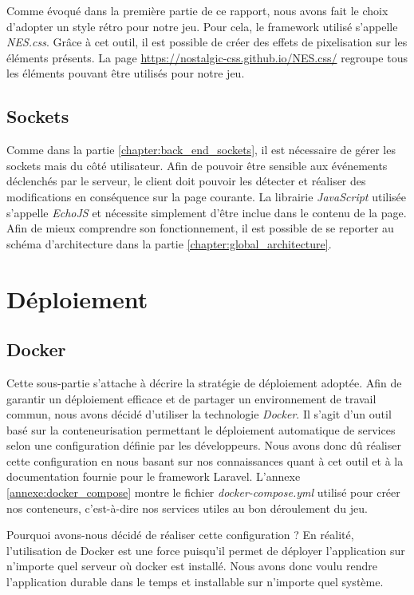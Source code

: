 \documentclass{tnreport}
\begin{document}

Comme évoqué dans la première partie de ce rapport, nous avons fait le choix d'adopter un style rétro pour notre jeu. Pour cela, le framework utilisé s'appelle \textit{NES.css}. Grâce à cet outil, il est possible de créer des effets de pixelisation sur les éléments présents. La page \url{https://nostalgic-css.github.io/NES.css/} regroupe tous les éléments pouvant être utilisés pour notre jeu. 

\subsection{Sockets}

Comme dans la partie \ref{chapter:back_end_sockets}, il est nécessaire de gérer les sockets mais du côté utilisateur. Afin de pouvoir être sensible aux événements déclenchés par le serveur, le client doit pouvoir les détecter et réaliser des modifications en conséquence sur la page courante. La librairie \textit{JavaScript} utilisée s'appelle \textit{EchoJS} et nécessite simplement d'être inclue dans le contenu de la page. Afin de mieux comprendre son fonctionnement, il est possible de se reporter au schéma d'architecture dans la partie \ref{chapter:global_architecture}.

\section{Déploiement}

\subsection{Docker}

Cette sous-partie s'attache à décrire la stratégie de déploiement adoptée. Afin de garantir un déploiement efficace et de partager un environnement de travail commun, nous avons décidé d'utiliser la technologie \textit{Docker}. Il s'agit d'un outil basé sur la conteneurisation permettant le déploiement automatique de services selon une configuration définie par les développeurs. Nous avons donc dû réaliser cette configuration en nous basant sur nos connaissances quant à cet outil et à la documentation fournie pour le framework Laravel. L'annexe \ref{annexe:docker_compose} montre le fichier \textit{docker-compose.yml} utilisé pour créer nos conteneurs, c'est-à-dire nos services utiles au bon déroulement du jeu.

Pourquoi avons-nous décidé de réaliser cette configuration ? En réalité, l'utilisation de Docker est une force puisqu'il permet de déployer l'application sur n'importe quel serveur où docker est installé. Nous avons donc voulu rendre l'application durable dans le temps et installable sur n'importe quel système.
\end{document}
